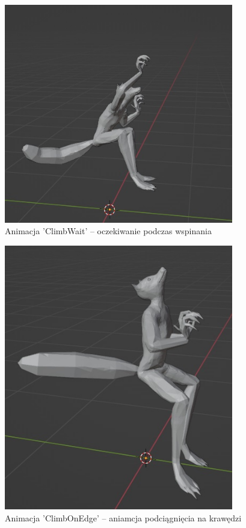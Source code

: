 \documentclass[12pt,twoside]{article}
\begin{document}
\begin{figure}[!ht]
    \centering
	\includegraphics[width=10cm]{RealizacjaProjektu/MC/Animation_Climb_Wait.jpg}
	\caption{Animacja 'ClimbWait' -- oczekiwanie podczas wspinania}
    \label{Animation:ClimbWait}
\end{figure}
\begin{figure}[!ht]
    \centering
	\includegraphics[width=10cm]{RealizacjaProjektu/MC/Animation_ClimbOnEdge.jpg}
	\caption{Animacja 'ClimbOnEdge' -- aniamcja podciągnięcia na krawędzi }
    \label{Animation:ClimbOnEdge}
\end{figure}
\end{document}
